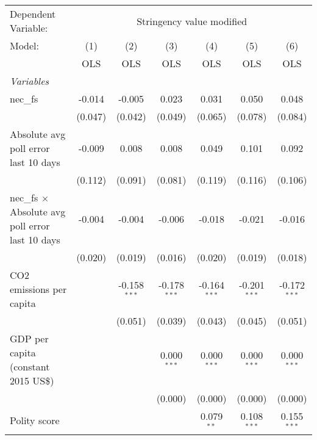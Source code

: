
\begingroup
\centering
\begin{tabular}{lcccccc}
   \toprule
   Dependent Variable: & \multicolumn{6}{c}{Stringency value modified}\\
   Model:                                                  & (1)     & (2)            & (3)            & (4)            & (5)            & (6)\\  
                                                           &  OLS    & OLS            & OLS            & OLS            & OLS            & OLS\\  
   \midrule
   \emph{Variables}\\
   nec\_fs                                                 & -0.014  & -0.005         & 0.023          & 0.031          & 0.050          & 0.048\\   
                                                           & (0.047) & (0.042)        & (0.049)        & (0.065)        & (0.078)        & (0.084)\\   
   Absolute avg poll error last 10 days                    & -0.009  & 0.008          & 0.008          & 0.049          & 0.101          & 0.092\\   
                                                           & (0.112) & (0.091)        & (0.081)        & (0.119)        & (0.116)        & (0.106)\\   
   nec\_fs $\times$ Absolute avg poll error last 10 days   & -0.004  & -0.004         & -0.006         & -0.018         & -0.021         & -0.016\\   
                                                           & (0.020) & (0.019)        & (0.016)        & (0.020)        & (0.019)        & (0.018)\\   
   CO2 emissions per capita                                &         & -0.158$^{***}$ & -0.178$^{***}$ & -0.164$^{***}$ & -0.201$^{***}$ & -0.172$^{***}$\\   
                                                           &         & (0.051)        & (0.039)        & (0.043)        & (0.045)        & (0.051)\\   
   GDP per capita (constant 2015 US\$)                     &         &                & 0.000$^{***}$  & 0.000$^{***}$  & 0.000$^{***}$  & 0.000$^{***}$\\   
                                                           &         &                & (0.000)        & (0.000)        & (0.000)        & (0.000)\\   
   Polity score                                            &         &                &                & 0.079$^{**}$   & 0.108$^{***}$  & 0.155$^{***}$\\   

\end{tabular}
